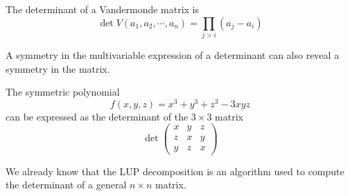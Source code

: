   \begin{theorem}
    The determinant of a Vandermonde matrix is
    \begin{equation}
      \det{V(a_1, a_2, \cdots, a_n)} = \prod_{j>i} (a_j - a_i)
    \end{equation}
  \end{theorem}

  A symmetry in the multivariable expression of a determinant can also reveal a symmetry in the matrix.

  \begin{example}[2019 Putnam A1]
    The symmetric polynomial 
    \begin{equation}
       f(x, y, z) = x^3 + y^3 + z^3 - 3 x y z
    \end{equation}
    can be expressed as the determinant of the $3 \times 3$ matrix
    \begin{equation}
      \det{\begin{pmatrix}
      x&y&z\\
      z&x&y\\
      y&z&x
      \end{pmatrix}}
    \end{equation}
  \end{example}


  We already know that the LUP decomposition is an algorithm used to compute the determinant of a general $n \times n$ matrix. 

